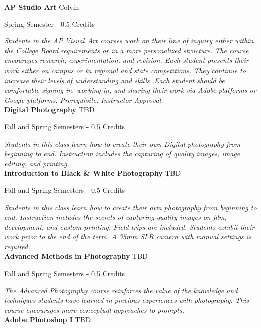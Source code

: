 \noindent\textbf{AP Studio Art} \hfill Colvin

\noindent Spring Semester - 0.5 Credits

\vspace{1mm}\emph{Students in the AP Visual Art courses work on their line of inquiry either within the College Board requirements or in a more personalized structure. The course encourages research, experimentation, and revision. Each student presents their work either on campus or in regional and state competitions. They continue to increase their levels of understanding and skills. Each student should be comfortable signing in, working in, and sharing their work via Adobe platforms or Google platforms. Prerequisite: Instructor Approval.}\\

\noindent\textbf{Digital Photography} \hfill TBD

\noindent Fall and Spring Semesters - 0.5 Credits

\vspace{1mm}\emph{Students in this class learn how to create their own Digital photography from beginning to end. Instruction includes the capturing of quality images, image editing, and printing.}\\

\noindent\textbf{Introduction to Black \& White Photography} \hfill TBD

\noindent Fall and Spring Semesters - 0.5 Credits

\vspace{1mm}\emph{Students in this class learn how to create their own photography from beginning to end. Instruction includes the secrets of capturing quality images on film, development, and custom printing. Field trips are included. Students exhibit their work prior to the end of the term. A 35mm SLR camera with manual settings is required.}\\

\noindent\textbf{Advanced Methods in Photography} \hfill TBD

\noindent Fall and Spring Semesters - 0.5 Credits

\vspace{1mm}\emph{The Advanced Photography course reinforces the value of the knowledge and techniques students have learned in previous experiences with photography.  This course encourages more conceptual approaches to prompts.}\\

\noindent\textbf{Adobe Photoshop I} \hfill TBD

